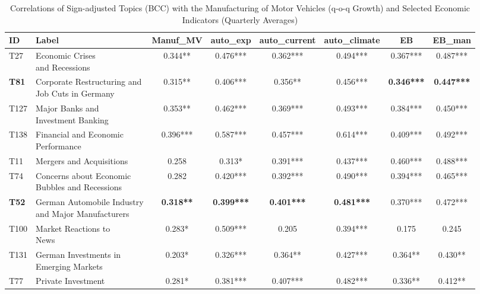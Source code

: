 \begin{table}[h!]
  \centering
  \begin{threeparttable}
    \scriptsize
    \renewcommand{\arraystretch}{1.3}
  \caption{Correlations of Sign-adjusted Topics (BCC) with the Manufacturing of Motor Vehicles (q-o-q Growth) and Selected Economic Indicators (Quarterly Averages)}
  \label{tab:cor_gdp_topics_bcc_2009_200_all_economic_indicators_quarterly}


\begin{tabular}{llcccccc}
\hline
ID & Label & Manuf\_MV & auto\_exp & auto\_current & auto\_climate & EB & EB\_man\\
\hline
T27 & \makecell[tl]{ Economic Crises \\ and Recessions} & 0.344** & 0.476*** & 0.362*** & 0.494*** & 0.367*** & 0.487***\\
\textbf{T81} & \makecell[tl]{ Corporate Restructuring and \\ Job Cuts in Germany} & 0.315** & 0.406*** & 0.356** & 0.456*** & \textbf{0.346***} & \textbf{0.447***}\\
T127 & \makecell[tl]{ Major Banks and \\ Investment Banking} & 0.353** & 0.462*** & 0.369*** & 0.493*** & 0.384*** & 0.450***\\
T138 & \makecell[tl]{ Financial and Economic \\ Performance} & 0.396*** & 0.587*** & 0.457*** & 0.614*** & 0.409*** & 0.492***\\
T11 & Mergers and Acquisitions & 0.258 & 0.313* & 0.391*** & 0.437*** & 0.460*** & 0.488***\\
\addlinespace
T74 & \makecell[tl]{ Concerns about Economic\\ Bubbles and Recessions} & 0.282 & 0.420*** & 0.392*** & 0.490*** & 0.394*** & 0.465***\\
\textbf{T52} & \makecell[tl]{ German Automobile Industry \\ and Major Manufacturers} & \textbf{0.318**} & \textbf{0.399***} & \textbf{0.401***} & \textbf{0.481***} & 0.370*** & 0.472***\\
T100 & \makecell[tl]{ Market Reactions to \\News} & 0.283* & 0.509*** & 0.205 & 0.394*** & 0.175 & 0.245\\
T131 & \makecell[tl]{German Investments in \\ Emerging Markets} & 0.203* & 0.326*** & 0.364** & 0.427*** & 0.364** & 0.430**\\
T77 & Private Investment & 0.281* & 0.381*** & 0.407*** & 0.482*** & 0.336** & 0.412**\\
\hline
\end{tabular}


\end{threeparttable}
\end{table}
